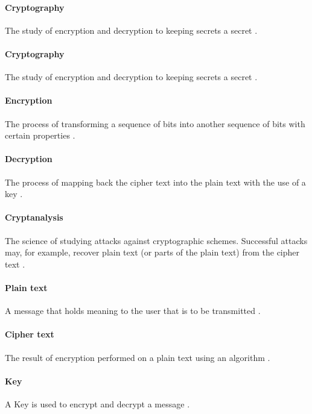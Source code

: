 \documentclass[11pt,a4paper]{report}
\begin{document}
\paragraph{Cryptography}
The study of encryption and decryption to keeping secrets a secret \cite{DBLP:series/isc/DelfsK07}.

\paragraph{Cryptography}
The study of encryption and decryption to keeping secrets a secret \cite{DBLP:series/isc/DelfsK07}.

\paragraph{Encryption}
The process of transforming a sequence of bits into another sequence of bits with certain properties \cite{Fabio2000LogicalSAT}.
 
\paragraph{Decryption}
The process of mapping back the cipher text into the plain text with the use of a key \cite{Fabio2000LogicalSAT}.

\paragraph{Cryptanalysis}
The science of studying attacks against cryptographic schemes. Successful attacks may, for example, recover plain text (or parts of the plain text) from the cipher text \cite{DBLP:books/sp/Buchmann02}.

\paragraph{Plain text}
A message that holds meaning to the user that is to be transmitted \cite{DBLP:books/sp/Buchmann02}.

\paragraph{Cipher text}
The result of encryption performed on a plain text using an algorithm \cite{Berti2003CISSP}.

\paragraph{Key}
A Key is used to encrypt and decrypt a message \cite{Berti2003CISSP}. 
\end{document}
